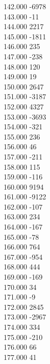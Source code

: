 { 142.000	-6978 \\
 143.000	-11 \\
 144.000	2217 \\
 145.000	-1811 \\
 146.000	235 \\
 147.000	-238 \\
 148.000	120 \\
 149.000	19 \\
 150.000	2647 \\
 151.000	-3187 \\
 152.000	4327 \\
 153.000	-3693 \\
 154.000	-321 \\
 155.000	236 \\
 156.000	46 \\
 157.000	-211 \\
 158.000	115 \\
 159.000	-116 \\
 160.000	9194 \\
 161.000	-9122 \\
 162.000	-107 \\
 163.000	234 \\
 164.000	-167 \\
 165.000	-78 \\
 166.000	764 \\
 167.000	-954 \\
 168.000	444 \\
 169.000	-169 \\
 170.000	34 \\
 171.000	-9 \\
 172.000	2845 \\
 173.000	-2967 \\
 174.000	334 \\
 175.000	-210 \\
 176.000	66 \\
 177.000	41 \\
}
